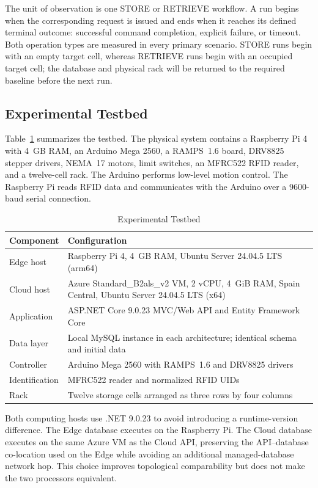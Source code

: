 \documentclass[conference]{IEEEtran}
\begin{document}
The unit of observation is one STORE or RETRIEVE workflow. A run begins when the corresponding request is issued and ends when it reaches its defined terminal outcome: successful command completion, explicit failure, or timeout. Both operation types are measured in every primary scenario. STORE runs begin with an empty target cell, whereas RETRIEVE runs begin with an occupied target cell; the database and physical rack will be returned to the required baseline before the next run.

\subsection{Experimental Testbed}
Table~\ref{tab:testbed} summarizes the testbed. The physical system contains a Raspberry Pi 4 with 4~GB RAM, an Arduino Mega 2560, a RAMPS~1.6 board, DRV8825 stepper drivers, NEMA~17 motors, limit switches, an MFRC522 RFID reader, and a twelve-cell rack. The Arduino performs low-level motion control. The Raspberry Pi reads RFID data and communicates with the Arduino over a 9600-baud serial connection.

\begin{table}[t]
\caption{Experimental Testbed}
\label{tab:testbed}
\centering
\footnotesize
\begin{tabular}{>{\raggedright\arraybackslash}p{} >{\raggedright\arraybackslash}p{}}
\toprule
Component & Configuration \\
\midrule
Edge host & Raspberry Pi 4, 4~GB RAM, Ubuntu Server 24.04.5 LTS (arm64) \\
Cloud host & Azure Standard\_B2als\_v2 VM, 2 vCPU, 4~GiB RAM, Spain Central, Ubuntu Server 24.04.5 LTS (x64) \\
Application & ASP.NET Core 9.0.23 MVC/Web API and Entity Framework Core \\
Data layer & Local MySQL instance in each architecture; identical schema and initial data \\
Controller & Arduino Mega 2560 with RAMPS~1.6 and DRV8825 drivers \\
Identification & MFRC522 reader and normalized RFID UIDs \\
Rack & Twelve storage cells arranged as three rows by four columns \\
\bottomrule
\end{tabular}
\end{table}

Both computing hosts use .NET 9.0.23 to avoid introducing a runtime-version difference. The Edge database executes on the Raspberry Pi. The Cloud database executes on the same Azure VM as the Cloud API, preserving the API--database co-location used on the Edge while avoiding an additional managed-database network hop. This choice improves topological comparability but does not make the two processors equivalent.
\end{document}
